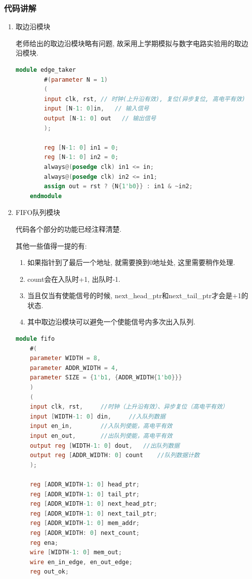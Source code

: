 \documentclass[UTF8]{article}
\begin{document}
\subsubsection{代码讲解}
\begin{enumerate}
	\item 取边沿模块\par
	老师给出的取边沿模块略有问题, 故采用上学期模拟与数字电路实验用的取边沿模块.
	\begin{lstlisting}[language=verilog]
	module edge_taker
	    #(parameter N = 1)
	    (
	    input clk, rst, // 时钟(上升沿有效), 复位(异步复位, 高电平有效)
	    input [N-1: 0]in,   // 输入信号
	    output [N-1: 0] out   // 输出信号
	    );
	    
	    reg [N-1: 0] in1 = 0;
	    reg [N-1: 0] in2 = 0;
	    always@(posedge clk) in1 <= in;
	    always@(posedge clk) in2 <= in1;
	    assign out = rst ? {N{1'b0}} : in1 & ~in2;
	endmodule
	\end{lstlisting}
	\item FIFO队列模块\par
	代码各个部分的功能已经注释清楚. \par
	其他一些值得一提的有:
	\begin{enumerate}
		\item 如果指针到了最后一个地址, 就需要换到0地址处, 这里需要稍作处理.
		\item count会在入队时+1, 出队时-1.
		\item 当且仅当有使能信号的时候, next\_head\_ptr和next\_tail\_ptr才会是+1的状态.
		\item 其中取边沿模块可以避免一个使能信号内多次出入队列.
	\end{enumerate}
	
	\begin{lstlisting}[language=verilog]
module fifo
    #(
    parameter WIDTH = 8,
    parameter ADDR_WIDTH = 4,
    parameter SIZE = {1'b1, {ADDR_WIDTH{1'b0}}}
    )
    (
    input clk, rst,		//时钟（上升沿有效）、异步复位（高电平有效）
    input [WIDTH-1: 0] din,		//入队列数据
    input en_in, 		//入队列使能，高电平有效
    input en_out,		//出队列使能，高电平有效
    output reg [WIDTH-1: 0] dout, 	//出队列数据
    output reg [ADDR_WIDTH: 0] count	//队列数据计数
    );
    
    reg [ADDR_WIDTH-1: 0] head_ptr;
    reg [ADDR_WIDTH-1: 0] tail_ptr;
    reg [ADDR_WIDTH-1: 0] next_head_ptr;
    reg [ADDR_WIDTH-1: 0] next_tail_ptr;
    reg [ADDR_WIDTH-1: 0] mem_addr;
    reg [ADDR_WIDTH: 0] next_count;
    reg ena;
    wire [WIDTH-1: 0] mem_out;
    wire en_in_edge, en_out_edge;
    reg out_ok;
    

\end{lstlisting}
\end{enumerate}
\end{document}
